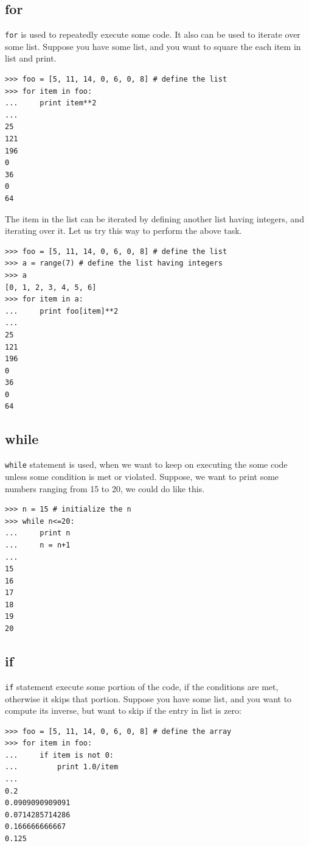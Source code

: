 \documentclass[10pt]{book}
\begin{document}
{\subsection{for}
\verb"for" is used to repeatedly execute some code. It also can be used to iterate over some list. Suppose you have some list, and you want to square the each item in list and print.
\beforeverb
\begin{verbatim}
>>> foo = [5, 11, 14, 0, 6, 0, 8] # define the list
>>> for item in foo:
...     print item**2
... 
25
121
196
0
36
0
64
\end{verbatim}
\afterverb
{}

The item in the list can be iterated by defining another list having integers, and iterating over it. Let us try this way to perform the above task. 
\beforeverb
\begin{verbatim}
>>> foo = [5, 11, 14, 0, 6, 0, 8] # define the list
>>> a = range(7) # define the list having integers
>>> a
[0, 1, 2, 3, 4, 5, 6]
>>> for item in a:
...     print foo[item]**2
... 
25
121
196
0
36
0
64
\end{verbatim}
\afterverb

\subsection{while}
{\tt while} statement is used, when we want to keep on executing the some code unless some condition is met or violated. Suppose, we want to print some numbers ranging from 15 to 20, we could do like this.
\beforeverb
\begin{verbatim}
>>> n = 15 # initialize the n
>>> while n<=20:
...     print n
...     n = n+1
... 
15
16
17
18
19
20
\end{verbatim}
\afterverb
{}

\subsection{if}
\verb"if" statement execute some portion of the code, if the conditions are met, otherwise it skips that portion. Suppose you have some list, and you want to compute its inverse, but want to skip if the entry in list is zero:
\beforeverb
\begin{verbatim}
>>> foo = [5, 11, 14, 0, 6, 0, 8] # define the array
>>> for item in foo:
...     if item is not 0:
...         print 1.0/item
... 
0.2
0.0909090909091
0.0714285714286
0.166666666667
0.125
\end{verbatim}
\afterverb
{}

}
\end{document}
